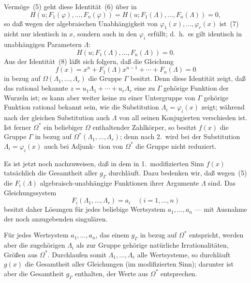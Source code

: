 \documentclass[12pt,a4paper]{article}
\begin{document}
Verm\"oge~(5) geht diese Identit\"at~(6) \"uber in
\begin{equation}\tag{7}
H(u; F_1(\varphi), \ldots, F_n(\varphi)) = H(u; F_1(\Lambda), \ldots, F_n(\Lambda)) = 0,
\end{equation}
so da\ss{} wegen der algebraischen Unabh\"angigkeit von $\varphi_1(x), \ldots, \varphi_r(x)$ ist~(7) nicht nur identisch in $x$, sondern auch in den $\varphi_i$ erf\"ullt; d.\ h.\ es gilt identisch in unabh\"angigen Parametern $\Lambda$:
\begin{equation}\tag{8}
H(u; F_1(\Lambda), \ldots, F_n(\Lambda)) = 0.
\end{equation}
Aus der Identit\"at~(8) l\"a\ss t sich folgern, da\ss{} die Gleichung
\begin{equation}\tag{9}
f(x) = x^n + F_1(\Lambda) x^{n-1} + \cdots + F_n(\Lambda) = 0
\end{equation}
in bezug auf $\Omega(\Lambda_1, \ldots, \Lambda_r)$ die Gruppe $\Gamma$ besitzt. Denn diese Identit\"at zeigt, da\ss{} das rational bekannte $z = u_1 \Lambda_1 + \cdots + u_r \Lambda_r$ eine zu $\Gamma$ geh\"orige Funktion der Wurzeln ist; es kann aber weiter keine zu einer Untergruppe von $\Gamma$ geh\"orige Funktion rational bekannt sein, wie die Substitution $\Lambda_i = \varphi_i(x)$ zeigt; w\"ahrend nach der gleichen Substitution auch $\Lambda$ von all seinen Konjugierten verschieden ist. Ist ferner $\Omega^*$ ein beliebiger $\Omega$ enthaltender Zahlk\"orper, so besitzt $f(x)$ die Gruppe $\Gamma$ in bezug auf $\Omega^*(\Lambda_1, \ldots, \Lambda_r)$; denn nach 2.\ wird bei der Substitution $\Lambda_i = \varphi_i(x)$ auch bei Adjunk-\ tion von $\Omega^*$ die Gruppe nicht reduziert.

Es ist jetzt noch nachzuweisen, da\ss{} in dem in 1.\ modifizierten Sinn $f(x)$ tats\"achlich die Gesamtheit aller $g_{\Gamma}$ durchl\"auft. Dazu bedenken wir, da\ss{} wegen~(5) die $F_i(\Lambda)$ algebraisch-unabh\"angige Funktionen ihrer Argumente $\Lambda$ sind. Das Gleichungssystem
\begin{equation}\tag{10}
F_i(\Lambda_1, \ldots, \Lambda_r) = a_i \quad (i = 1, \ldots, n)
\end{equation}
besitzt daher L\"osungen f\"ur jedes beliebige Wertsystem $a_1, \ldots, a_n$ --- mit Ausnahme der noch anzugebenden singul\"aren.

F\"ur jedes Wertsystem $a_1, \ldots, a_n$, das einem $g_{\Gamma}$ in bezug auf $\Omega^*$ entspricht, werden aber die zugeh\"origen $\Lambda_i$ als zur Gruppe geh\"orige nat\"urliche Irrationalit\"aten, Gr\"o\ss en aus $\Omega^*$. Durchlaufen somit $\Lambda_1, \ldots, \Lambda_r$ alle Wertsysteme, so durchl\"auft $g(x)$ die Gesamtheit aller Gleichungen (im modifizierten Sinn); darunter ist aber die Gesamtheit $g_{\Gamma}$ enthalten, der Werte aus $\Omega^*$ entsprechen.
\end{document}
